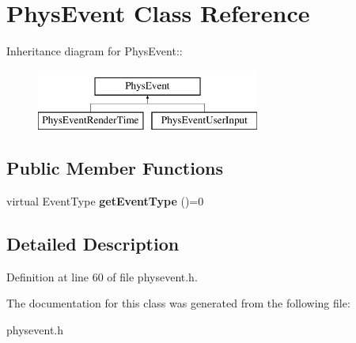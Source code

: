 \hypertarget{classPhysEvent}{
\section{PhysEvent Class Reference}
\label{d9/dc2/classPhysEvent}
}
Inheritance diagram for PhysEvent::\begin{figure}[H]
\begin{center}
\leavevmode
\includegraphics[height=2cm]{d9/dc2/classPhysEvent}
\end{center}
\end{figure}
\subsection*{Public Member Functions}
\begin{DoxyCompactItemize}
\item 
\hypertarget{classPhysEvent_afe21254180cdc4f12913bedcb81b6c6e}{
virtual EventType {\bfseries getEventType} ()=0}
\label{d9/dc2/classPhysEvent_afe21254180cdc4f12913bedcb81b6c6e}

\end{DoxyCompactItemize}


\subsection{Detailed Description}


Definition at line 60 of file physevent.h.

The documentation for this class was generated from the following file:\begin{DoxyCompactItemize}
\item 
physevent.h\end{DoxyCompactItemize}
